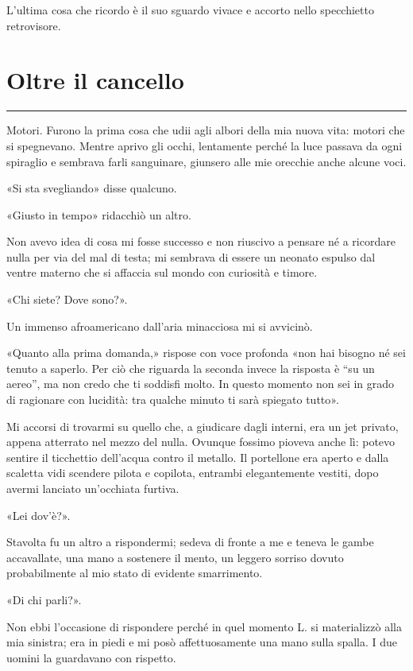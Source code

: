 \documentclass[a4paper,11pt,oneside,openright,final]{memoir}
\begin{document}
L'ultima cosa che ricordo è il suo sguardo vivace e accorto nello specchietto
retrovisore.

\chapter{Oltre il cancello}

\plainbreak{1}

Motori. Furono la prima cosa che udii agli albori della mia nuova vita: motori
che si spegnevano. Mentre aprivo gli occhi, lentamente perché la luce passava
da ogni spiraglio e sembrava farli sanguinare, giunsero alle mie orecchie anche
alcune voci.

«Si sta svegliando» disse qualcuno.

«Giusto in tempo» ridacchiò un altro.

Non avevo idea di cosa mi fosse successo e non riuscivo a pensare né a ricordare
nulla per via del mal di testa; mi sembrava di essere un neonato espulso dal
ventre materno che si affaccia sul mondo con curiosità e timore.

«Chi siete? Dove sono?».

Un immenso afroamericano dall'aria minacciosa mi si avvicinò.

«Quanto alla prima domanda,» rispose con voce profonda «non hai bisogno né sei
tenuto a saperlo. Per ciò che riguarda la seconda invece la risposta è ``su un
aereo'', ma non credo che ti soddisfi molto. In questo momento non sei in grado
di ragionare con lucidità: tra qualche minuto ti sarà spiegato tutto».

Mi accorsi di trovarmi su quello che, a giudicare dagli interni, era un jet
privato, appena atterrato nel mezzo del nulla. Ovunque fossimo pioveva anche lì:
potevo sentire il ticchettio dell'acqua contro il metallo. Il portellone era
aperto e dalla scaletta vidi scendere pilota e copilota, entrambi elegantemente
vestiti, dopo avermi lanciato un'occhiata furtiva.

«Lei dov'è?».

Stavolta fu un altro a rispondermi; sedeva di fronte a me e teneva le gambe
accavallate, una mano a sostenere il mento, un leggero sorriso dovuto
probabilmente al mio stato di evidente smarrimento.

«Di chi parli?».

Non ebbi l'occasione di rispondere perché in quel momento L. si materializzò
alla mia sinistra; era in piedi e mi posò affettuosamente una mano sulla spalla.
I due uomini la guardavano con rispetto.
\end{document}
